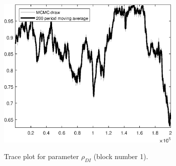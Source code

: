 \begin{figure}[H]
\centering
  \includegraphics[width=0.8\textwidth]{BRS_sectoral_rest/graphs/TracePlot_rho_DI_blck_1}\\
    \caption{Trace plot for parameter ${\rho_{DI}}$ (block number 1).}
\end{figure}
